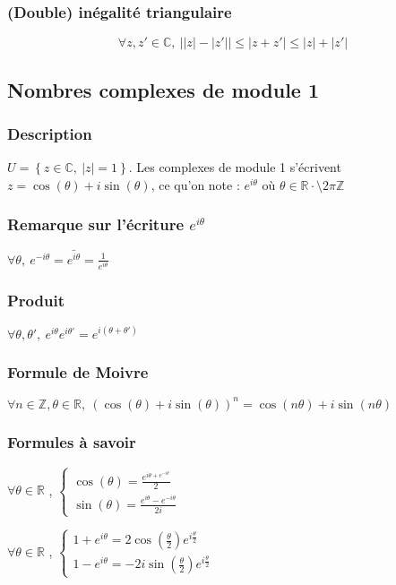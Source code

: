 \documentclass[12pt,a4paper,french]{book}
\begin{document}
			\subsubsection{(Double) inégalité triangulaire}
			\[\forall z,z' \in \mathbb{C},\ \left|\left|z\right|-\left|z'\right|\right|\leqslant\left|z+z'\right| \leqslant \left|z\right| + \left|z'\right|\]
		\subsection{Nombres complexes de module 1}
			\subsubsection{Description}
			$U = \left\{z \in \mathbb{C}, \ \left|z\right| = 1\right\}$. Les complexes de module 1 s'écrivent $z = \cos(\theta)+i\sin(\theta)$, ce qu'on note : $ e^{i\theta}$ où $\theta \in \mathbb{R} \cdot\setminus 2\pi \mathbb{Z}$
			\subsubsection{Remarque sur l'écriture $e^{i\theta}$}
			$\forall \theta, \ e^{-i\theta} = \bar{e^{i\theta}} = \frac{1}{e^{i\theta}} $
			\subsubsection{Produit}
			$\forall \theta, \theta', \ e^{i\theta} e^{i\theta'} = e^{i(\theta+\theta')}$
			\subsubsection{Formule de Moivre}
			$\forall n \in \mathbb{Z}, \theta \in \mathbb{R},\ (\cos(\theta)+i\sin(\theta))^n = \cos(n\theta)+i\sin(n\theta)$
			\subsubsection{Formules à savoir}
				$\forall \theta \in \mathbb{R}$ , $\left\{ \begin{array}{ll}
				\cos(\theta) = \frac{e^{i\theta + e^{-i\theta}}}{2} \\
				\sin(\theta) = \frac{e^{i\theta}- e^{-i \theta}}{2i}
			\end{array} \right. $
			
			$\forall \theta \in \mathbb{R}$ , $\left\{ \begin{array}{ll}
				1+e^{i \theta} = 2\cos\left(\frac{\theta}{2}\right) e^{i \frac{\theta}{2} } \\
				1-e^{i \theta} = -2i\sin\left(\frac{\theta}{2}\right) e^{i \frac{\theta}{2} }
			\end{array} \right. $
\end{document}
